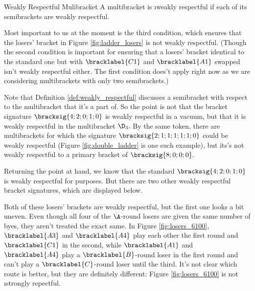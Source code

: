 {    \begin{definition}{Weakly Respectful Mulibracket}{}
        A multibracket is \i{weakly respectful} if each of its semibrackets are weakly respectful.
    \end{definition}


    Most important to us at the moment is the third condition, which ensures that the losers' bracket in Figure \ref{fig:ladder_losers} is not weakly respectful. (Though the second condition is important for ensuring that a losers' bracket identical to the standard one but with $\bracklabel{C1}$ and $\bracklabel{A1}$ swapped isn't weakly respectful either. The first condition does't apply right now as we are considering multibrackets with only two semibrackets.)

    Note that Definition \ref{def:weakly_respectful} discusses a semibracket with respect to the multibracket that it's a part of. So the point is not that the bracket signature $\bracksig{4;2;0;1;0}$ is weakly respectful in a vacuum, but that it is weakly respectful in the multibracket $\D_3.$ By the same token, there are multibrackets for which the signature $\bracksig{2;1;1;1;1;1;0}$ could be weakly respectful (Figure \ref{fig:double_ladder} is one such example), but its's not weakly respectful to a primary bracket of $\bracksig{8;0;0;0}.$


    Returning the point at hand, we know that the standard $\bracksig{4;2;0;1;0}$ is weakly respectful for purposes. But there are two other weakly respectful bracket signatures, which are displayed below.


    Both of these losers' brackets are weakly respectful, but the first one looks a bit uneven. Even though all four of the $\A$-round losers are given the same number of byes, they aren't treated the exact same. In Figure \ref{fig:losers_6100}, $\bracklabel{A3}$ and $\bracklabel{A4}$ play each other the first round and $\bracklabel{C1}$ in the second, while $\bracklabel{A1}$ and $\bracklabel{A4}$ play a $\bracklabel{B}$-round loser in the first round and can't play a $\bracklabel{C}$-round loser until the third. It's not clear which route is better, but they are definitely different: Figure \ref{fig:losers_6100} is not \i{strongly repectful}.

}
